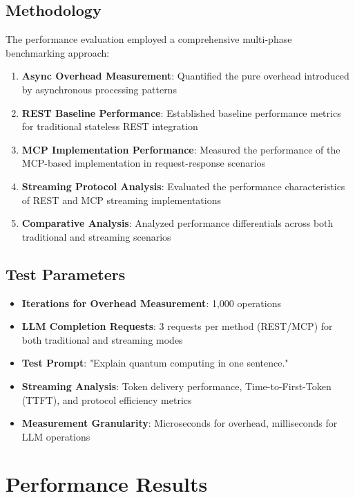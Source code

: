 \subsection{Methodology}

The performance evaluation employed a comprehensive multi-phase benchmarking approach:

\begin{enumerate}
    \item \textbf{Async Overhead Measurement}: Quantified the pure overhead introduced by asynchronous processing patterns
    \item \textbf{REST Baseline Performance}: Established baseline performance metrics for traditional stateless REST integration
    \item \textbf{MCP Implementation Performance}: Measured the performance of the MCP-based implementation in request-response scenarios
    \item \textbf{Streaming Protocol Analysis}: Evaluated the performance characteristics of REST and MCP streaming implementations
    \item \textbf{Comparative Analysis}: Analyzed performance differentials across both traditional and streaming scenarios
\end{enumerate}

\subsection{Test Parameters}

\begin{itemize}
    \item \textbf{Iterations for Overhead Measurement}: 1,000 operations
    \item \textbf{LLM Completion Requests}: 3 requests per method (REST/MCP) for both traditional and streaming modes
    \item \textbf{Test Prompt}: "Explain quantum computing in one sentence."
    \item \textbf{Streaming Analysis}: Token delivery performance, Time-to-First-Token (TTFT), and protocol efficiency metrics
    \item \textbf{Measurement Granularity}: Microseconds for overhead, milliseconds for LLM operations
\end{itemize}

\section{Performance Results}

